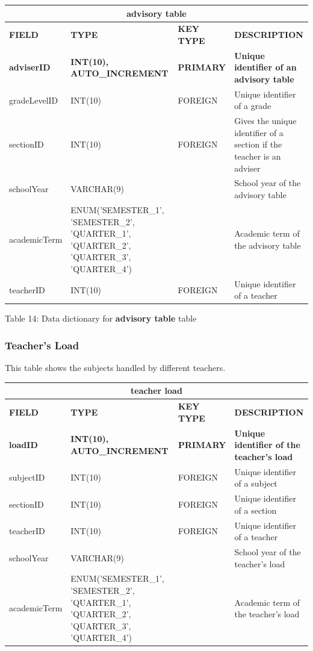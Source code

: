 \documentclass[11pt,a4paper,titlepage]{article}
\begin{document}
\vspace{.5cm}
\begin{longtable}{ |p{2.5cm}|p{4.5cm}|p{2.5cm}|p{3cm}|  }
    \hline
    \multicolumn{4}{|c|}{\textbf{advisory table}} \\
    \hline
    \textbf{FIELD}&\textbf{TYPE}&\textbf{KEY TYPE}&\textbf{DESCRIPTION}\\
    \hline
    \textbf{adviserID}  & \textbf{INT(10), AUTO\_INCREMENT} & \textbf{PRIMARY} & \textbf{Unique identifier of an advisory table}\\ \hline
    gradeLevelID   & INT(10) & FOREIGN & Unique identifier of a grade   \\ \hline
    sectionID   & INT(10)   & FOREIGN & Gives the unique identifier of a section if the teacher is an adviser\\ \hline
    schoolYear   & VARCHAR(9)   & & School year of the advisory table\\ \hline
    academicTerm   & ENUM('SEMESTER\_1', 'SEMESTER\_2', 'QUARTER\_1', 'QUARTER\_2', 'QUARTER\_3', 'QUARTER\_4')   & & Academic term of the advisory table\\ \hline
    teacherID & INT(10) & FOREIGN & Unique identifier of a teacher\\ \hline
\end{longtable}

\vspace{.5cm}
\begin{center}
    Table 14: Data dictionary for \textbf{advisory table} table
\end{center}

\newpage

\subsubsection{Teacher's Load}

This table shows the subjects handled by different teachers.

\vspace{1cm}
\begin{longtable}{ |p{2.5cm}|p{4.5cm}|p{2.5cm}|p{3cm}|  }
    \hline
    \multicolumn{4}{|c|}{\textbf{teacher load}} \\
    \hline
    \textbf{FIELD}&\textbf{TYPE}&\textbf{KEY TYPE}&\textbf{DESCRIPTION}\\
    \hline
    \textbf{loadID}  & \textbf{INT(10), AUTO\_INCREMENT} & \textbf{PRIMARY} & \textbf{Unique identifier of the teacher's load}\\ \hline
    subjectID   & INT(10) & FOREIGN & Unique identifier of a subject\\ \hline
    sectionID   & INT(10) & FOREIGN & Unique identifier of a section\\ \hline
    teacherID   & INT(10) & FOREIGN & Unique identifier of a teacher\\ \hline
    schoolYear   & VARCHAR(9)   & & School year of the teacher's load\\ \hline
    academicTerm   & ENUM('SEMESTER\_1', 'SEMESTER\_2', 'QUARTER\_1', 'QUARTER\_2', 'QUARTER\_3', 'QUARTER\_4')   & & Academic term of the teacher's load\\ \hline
\end{longtable}
\end{document}
